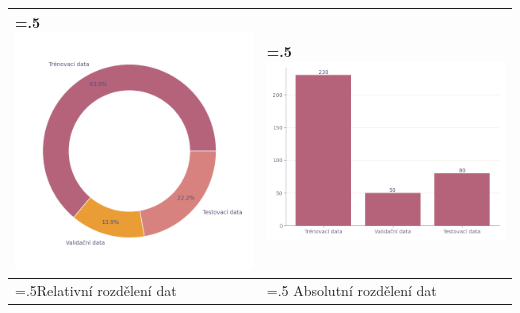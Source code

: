 \documentclass{datamining}
\begin{document}
	\begin{tabularx}{\textwidth}{|>{\hsize=.5\hsize}X|>{\hsize=.5\hsize}X|}	
		\hline
		\includegraphics[width=0.9\hsize]{training_data_split}
		 &
		 \includegraphics[width=0.9\hsize]{training_data_histogram}
		 \\
		\hline
		Relativní rozdělení dat & Absolutní rozdělení dat \\
		\hline
	\end{tabularx}
	\vspace{2cm}
\end{document}

